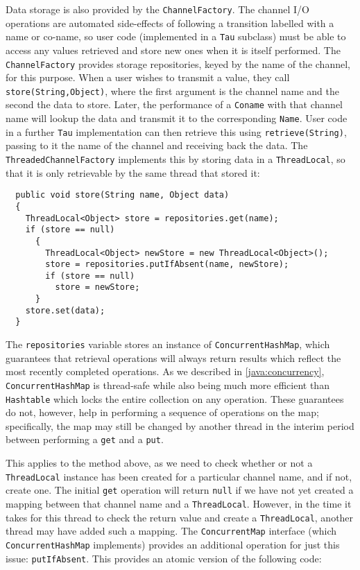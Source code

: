 Data storage is also provided by the \texttt{ChannelFactory}.  The
channel I/O operations are automated side-effects of following a
transition labelled with a name or co-name, so user code (implemented
in a \texttt{Tau} subclass) must be able to access any values
retrieved and store new ones when it is itself performed.  The
\texttt{ChannelFactory} provides storage repositories, keyed by the
name of the channel, for this purpose.  When a user wishes to transmit
a value, they call \texttt{store(String,Object)}, where the first
argument is the channel name and the second the data to store.  Later,
the performance of a \texttt{Coname} with that channel name will
lookup the data and transmit it to the corresponding \texttt{Name}.
User code in a further \texttt{Tau} implementation can then retrieve
this using \texttt{retrieve(String)}, passing to it the name of the
channel and receiving back the data.  The
\texttt{ThreadedChannelFactory} implements this by storing data in a
\texttt{ThreadLocal}, so that it is only retrievable by the same
thread that stored it:

\begin{verbatim}
  public void store(String name, Object data)
  {
    ThreadLocal<Object> store = repositories.get(name);
    if (store == null)
      {
        ThreadLocal<Object> newStore = new ThreadLocal<Object>();
        store = repositories.putIfAbsent(name, newStore);
        if (store == null)
          store = newStore;
      }
    store.set(data);
  }
\end{verbatim}

The \texttt{repositories} variable stores an instance of
\texttt{ConcurrentHashMap}, which guarantees that retrieval operations
will always return results which reflect the most recently completed
operations.  As we described in \ref{java:concurrency},
\texttt{ConcurrentHashMap} is thread-safe while also being much more
efficient than \texttt{Hashtable} which locks the entire collection on
any operation.  These guarantees do not, however, help in performing a
sequence of operations on the map; specifically, the map may still be
changed by another thread in the interim period between performing a
\texttt{get} and a \texttt{put}.

This applies to the method above, as we need to check whether or not a
\texttt{ThreadLocal} instance has been created for a particular
channel name, and if not, create one.  The initial \texttt{get}
operation will return \texttt{null} if we have not yet created a mapping
between that channel name and a \texttt{ThreadLocal}.  However, in the
time it takes for this thread to check the return value and create a
\texttt{ThreadLocal}, another thread may have added such a mapping.
The \texttt{ConcurrentMap} interface (which \texttt{ConcurrentHashMap}
implements) provides an additional operation for just this issue:
\texttt{putIfAbsent}.  This provides an atomic version of the
following code:

